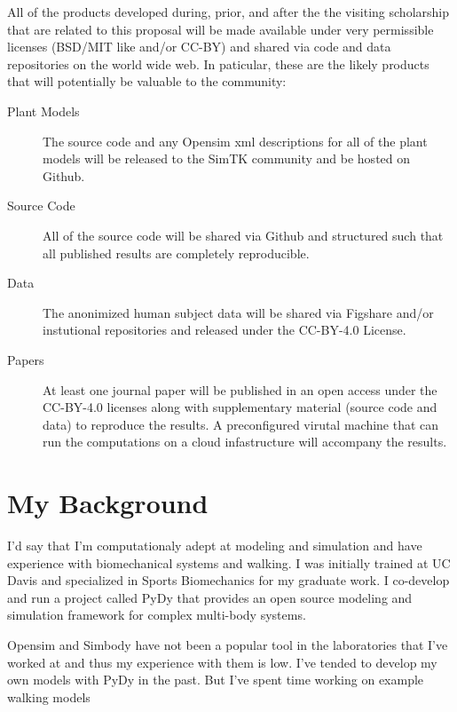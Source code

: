 \documentclass[11pt]{article}
\begin{document}
All of the products developed during, prior, and after the the visiting
scholarship that are related to this proposal will be made available under very
permissible licenses (BSD/MIT like and/or CC-BY) and shared via code and data
repositories on the world wide web. In paticular, these are the likely products
that will potentially be valuable to the community:

\begin{description}
  \item[Plant Models] The source code and any Opensim xml descriptions for all
    of the plant models will be released to the SimTK community and be hosted on
    Github.
  \item[Source Code] All of the source code will be shared via Github and
    structured such that all published results are completely reproducible.
  \item[Data] The anonimized human subject data will be shared via Figshare
    and/or instutional repositories and released under the CC-BY-4.0 License.
  \item[Papers] At least one journal paper will be published in an open access
    under the CC-BY-4.0 licenses along with supplementary material (source
    code and data) to reproduce the results. A preconfigured virutal machine
    that can run the computations on a cloud infastructure will accompany the
    results.
\end{description}

\section{My Background}

I'd say that I'm computationaly adept at modeling and simulation and have
experience with biomechanical systems and walking. I was initially trained at
UC Davis and specialized in Sports Biomechanics for my graduate work. I
co-develop and run a project called PyDy that provides an open source modeling
and simulation framework for complex multi-body systems.

Opensim and Simbody have not been a popular tool in the laboratories that I've
worked at and thus my experience with them is low. I've tended to develop my
own models with PyDy in the past. But I've spent time working on example
walking models

%
%
%
%
%
\end{document}
